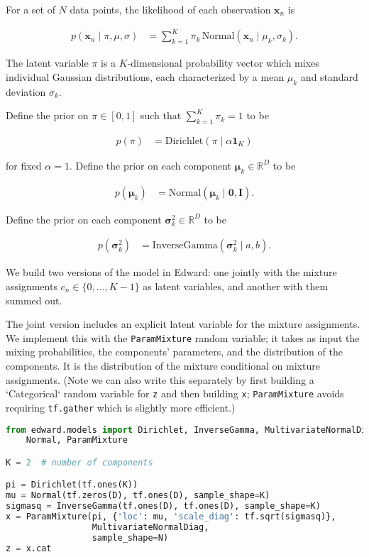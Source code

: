 For a set of $N$ data points,
the likelihood of each observation $\mathbf{x}_n$ is

\begin{align*}
  p(\mathbf{x}_n \mid \pi, \mu, \sigma)
  &=
  \sum_{k=1}^K \pi_k \, \text{Normal}(\mathbf{x}_n \mid \mu_k, \sigma_k).
\end{align*}

The latent variable $\pi$ is a $K$-dimensional probability vector
which mixes individual Gaussian distributions, each
characterized by a mean $\mu_k$ and standard deviation $\sigma_k$.

Define the prior on $\pi\in[0,1]$ such that $\sum_{k=1}^K\pi_k=1$ to be

\begin{align*}
  p(\pi)
  &=
  \text{Dirichlet}(\pi \mid \alpha \mathbf{1}_{K})
\end{align*}

for fixed $\alpha=1$. Define the prior on each component $\mathbf{\mu}_k\in\mathbb{R}^D$ to be

\begin{align*}
  p(\mathbf{\mu}_k)
  &=
  \text{Normal}(\mathbf{\mu}_k \mid \mathbf{0}, \mathbf{I}).
\end{align*}

Define the prior on each component $\mathbf{\sigma}_k^2\in\mathbb{R}^D$ to be

\begin{align*}
  p(\mathbf{\sigma}_k^2)
  &=
  \text{InverseGamma}(\mathbf{\sigma}_k^2 \mid a, b).
\end{align*}

We build two versions of the model in Edward: one jointly with the
mixture assignments $c_n\in\{0,\ldots,K-1\}$ as latent variables,
and another with them summed out.

The joint version includes an explicit latent variable for the mixture
assignments. We implement this with the \texttt{ParamMixture} random
variable; it takes as input the mixing probabilities, the components'
parameters, and the distribution of the components. It is the
distribution of the mixture conditional on mixture assignments. (Note
we can also write this separately by first building a `Categorical`
random variable for \texttt{z} and then building \texttt{x}; \texttt{ParamMixture} avoids
requiring \texttt{tf.gather} which is slightly more efficient.)

\begin{lstlisting}[language=Python]
from edward.models import Dirichlet, InverseGamma, MultivariateNormalDiag, \
    Normal, ParamMixture

K = 2  # number of components

pi = Dirichlet(tf.ones(K))
mu = Normal(tf.zeros(D), tf.ones(D), sample_shape=K)
sigmasq = InverseGamma(tf.ones(D), tf.ones(D), sample_shape=K)
x = ParamMixture(pi, {'loc': mu, 'scale_diag': tf.sqrt(sigmasq)},
                 MultivariateNormalDiag,
                 sample_shape=N)
z = x.cat
\end{lstlisting}

